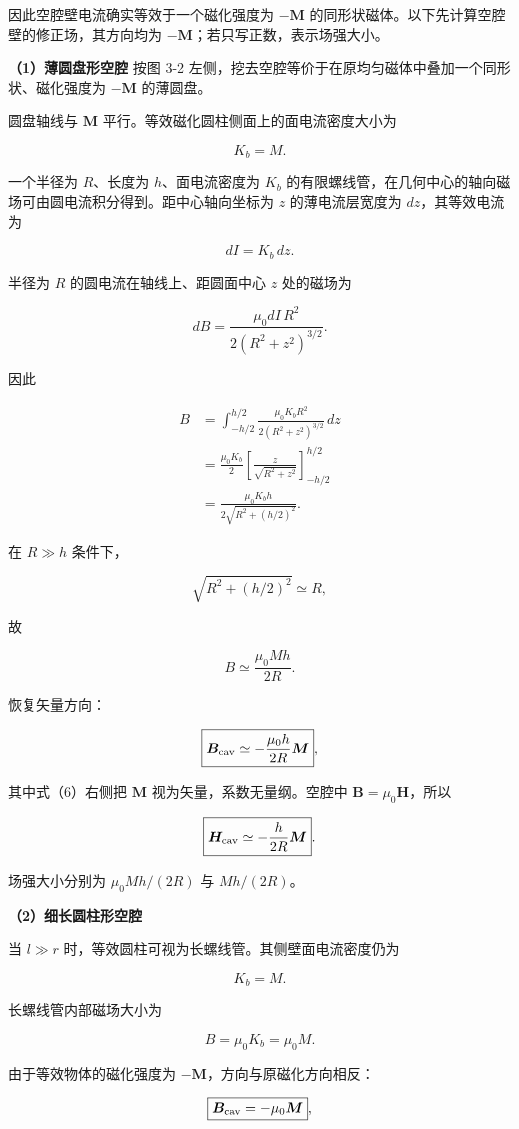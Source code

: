 \documentclass[12pt,a4paper,UTF8]{ctexart}
\begin{document}
因此空腔壁电流确实等效于一个磁化强度为 \(-\bm M\)
的同形状磁体。以下先计算空腔壁的修正场，其方向均为
\(-\bm M\)；若只写正数，表示场强大小。

\textbf{（1）薄圆盘形空腔} 按图 3-2
左侧，挖去空腔等价于在原均匀磁体中叠加一个同形状、磁化强度为 \(-\bm M\)
的薄圆盘。

圆盘轴线与 \(\bm M\) 平行。等效磁化圆柱侧面上的面电流密度大小为

\[K_b=M.\]

一个半径为 \(R\)、长度为 \(h\)、面电流密度为 \(K_b\)
的有限螺线管，在几何中心的轴向磁场可由圆电流积分得到。距中心轴向坐标为
\(z\) 的薄电流层宽度为 \(dz\)，其等效电流为

\[dI=K_b\,dz.\]

半径为 \(R\) 的圆电流在轴线上、距圆面中心 \(z\) 处的磁场为

\[dB=\frac{\mu_0dI\,R^2}{2(R^2+z^2)^{3/2}}.\]

因此

\[\begin{aligned}
B
&=\int_{-h/2}^{h/2}\frac{\mu_0K_bR^2}{2(R^2+z^2)^{3/2}}\,dz\\
&=\frac{\mu_0K_b}{2}
\left[\frac{z}{\sqrt{R^2+z^2}}\right]_{-h/2}^{h/2}\\
&=\frac{\mu_0K_bh}{2\sqrt{R^2+(h/2)^2}}.
\end{aligned}\]

在 \(R\gg h\) 条件下，

\[\sqrt{R^2+(h/2)^2}\simeq R,\]

故

\[B\simeq\frac{\mu_0Mh}{2R}.\]

恢复矢量方向：

\[\boxed{\bm B_{\rm cav}\simeq-\frac{\mu_0h}{2R}\bm M},\]

其中式（6）右侧把 \(\bm M\) 视为矢量，系数无量纲。空腔中
\(\bm B=\mu_0\bm H\)，所以

\[\boxed{\bm H_{\rm cav}\simeq-\frac{h}{2R}\bm M}.\]

场强大小分别为 \(\mu_0Mh/(2R)\) 与 \(Mh/(2R)\)。

\textbf{（2）细长圆柱形空腔}

当 \(l\gg r\) 时，等效圆柱可视为长螺线管。其侧壁面电流密度仍为

\[K_b=M.\]

长螺线管内部磁场大小为

\[B=\mu_0K_b=\mu_0M.\]

由于等效物体的磁化强度为 \(-\bm M\)，方向与原磁化方向相反：

\[\boxed{\bm B_{\rm cav}=-\mu_0\bm M},\]
\end{document}
